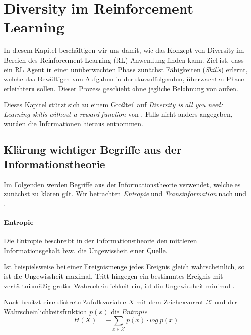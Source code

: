 \section{Diversity im Reinforcement Learning}
\label{sec:diversity}
In diesem Kapitel beschäftigen wir uns damit, wie das Konzept von Diversity im Bereich des Reinforcement Learning (RL) Anwendung finden kann. Ziel ist, dass ein RL Agent in einer unüberwachten Phase zunächst Fähigkeiten (\textit{Skills}) erlernt, welche das Bewältigen von Aufgaben in der darauffolgenden, überwachten Phase erleichtern sollen. Dieser Prozess geschieht ohne jegliche Belohnung von außen.

Dieses Kapitel stützt sich zu einem Großteil auf \textit{Diversity is all you need: Learning skills without a reward function} von \citeauthor{diversity_eysenbach} \cite{diversity_eysenbach}. Falls nicht anders angegeben, wurden die Informationen hieraus entnommen.

\subsection{Klärung wichtiger Begriffe aus der Informationstheorie}
\label{sec:informationtheory}
Im Folgenden werden Begriffe aus der Informationstheorie verwendet, welche es zunächst zu klären gilt. Wir betrachten \textit{Entropie} und \textit{Transinformation} nach \cite{elements_cover} und \cite{information_werner}.

\paragraph{Entropie}

Die Entropie beschreibt in der Informationstheorie den mittleren Informationsgehalt bzw. die Ungewissheit einer Quelle.

Ist beispielsweise bei einer Ereignismenge jedes Ereignis gleich wahrscheinlich, so ist die Ungewissheit maximal. Tritt hingegen ein bestimmtes Ereignis mit verhältnismäßig großer Wahrscheinlichkeit ein, ist die Ungewissheit minimal \cite{information_werner}.

Nach \cite{elements_cover} besitzt eine diskrete Zufallsvariable $ X $ mit dem Zeichenvorrat $ \mathcal{X} $ und der Wahrscheinlichkeitsfunktion $ p(x) $ die \textit{Entropie}
\begin{equation*}
    H(X) = -\sum_{x \in \mathcal{X}} p(x) \cdot log\ p(x) \label{eq:entropy}
\end{equation*}

